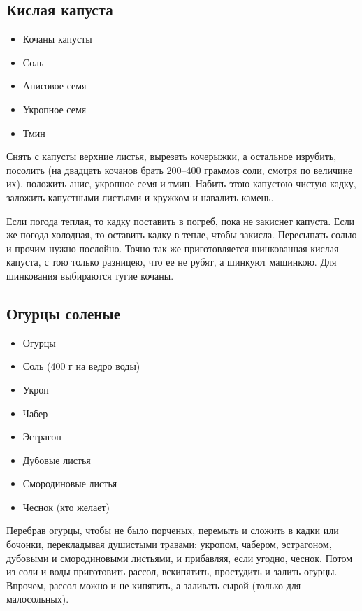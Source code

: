 \subsection{Кислая капуста}

\begin{itemize}
	\item Кочаны капусты 
    \item Соль
    \item Анисовое семя 
    \item Укропное семя 
    \item Тмин
\end{itemize}

Снять с капусты верхние листья, вырезать кочерыжки, а остальное изрубить, посолить (на двадцать кочанов брать 200–400 граммов соли, смотря по величине их), положить анис, укропное семя и тмин. Набить этою капустою чистую кадку, заложить капустными листьями и кружком и навалить камень.

Если погода теплая, то кадку поставить в погреб, пока не закиснет капуста. Если же погода холодная, то оставить кадку в тепле, чтобы закисла. Пересыпать солью и прочим нужно послойно. Точно так же приготовляется шинкованная кислая капуста, с тою только разницею, что ее не рубят, а шинкуют машинкою. Для шинкования выбираются тугие кочаны.

\subsection{Огурцы соленые}

\begin{itemize}
	\item Огурцы 
    \item Соль (400 г на ведро воды) 
    \item Укроп 
    \item Чабер
    \item Эстрагон
    \item Дубовые листья
    \item Смородиновые листья
    \item Чеснок (кто желает)
\end{itemize}

Перебрав огурцы, чтобы не было порченых, перемыть и сложить в кадки или бочонки, перекладывая душистыми травами: укропом, чабером, эстрагоном, дубовыми и смородиновыми листьями, и прибавляя, если угодно, чеснок. Потом из соли и воды приготовить рассол, вскипятить, простудить и залить огурцы. Впрочем, рассол можно и не кипятить, а заливать сырой (только для малосольных).

